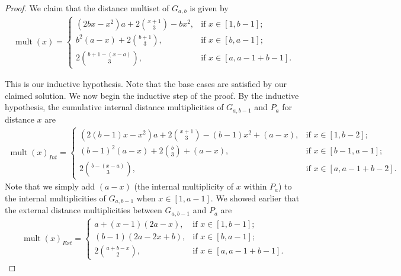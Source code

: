 \documentclass[12]{article}
\DeclareMathOperator{\mult}{mult}
\theoremstyle{definition}
\begin{document}
\begin{proof}
	
	
	We claim that the distance multiset of $G_{a,b}$ is given by
	\begin{align*}
		\mult(x) = 
		\begin{cases}
			(2bx-x^2)a + 2{x+1 \choose 3} - bx^2, &\text{if } x \in [1,b-1];	\\
			b^2(a-x) + 2{b+1 \choose 3}, &\text{if }x \in [b,a-1];	\\
			2{b+1 - (x-a) \choose 3}, &\text{if }x \in [a,a-1+b-1].
		\end{cases}
	\end{align*}
	
	
	
	
	This is our inductive hypothesis.  Note that the base cases are satisfied by our claimed solution.  We now begin the inductive step of the proof.  By the inductive hypothesis, the cumulative internal distance multiplicities of $G_{a,b-1}$ and $P_a$ for distance $x$ are
		\begin{align*}
			\mult(x)_{Int} = 
			\begin{cases}
				(2(b-1)x-x^2)a + 2{x+1 \choose 3} - (b-1)x^2 + (a-x), &\text{if } x \in [1,b-2];	\\
				(b-1)^2(a-x) + 2{b \choose 3} + (a-x), &\text{if }x \in [b-1,a-1];	\\
				2{b - (x-a) \choose 3}, &\text{if }x \in [a,a-1+b-2].
			\end{cases}
		\end{align*}
	Note that we simply add $(a-x)$ (the internal multiplicity of $x$ within $P_a$) to the internal multiplicities of $G_{a,b-1}$ when $x \in [1,a-1]$.
	We showed earlier that the external distance multiplicities between $G_{a,b-1}$ and $P_a$ are
	\begin{align*}
		\mult(x)_{Ext} =
		\begin{cases}
			a+(x-1)(2a-x), &\text{if } x \in [1,b-1];	\\
			(b-1)(2a-2x+b), &\text{if } x \in [b,a-1];	\\
			2{a+b-x \choose 2}, &\text{if } x \in [a,a-1+b-1].
		\end{cases}
	\end{align*}
	

\end{proof}
\end{document}

